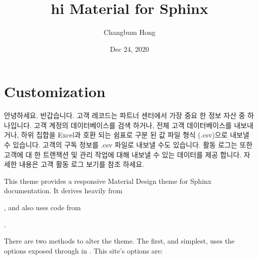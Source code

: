 \documentclass[letterpaper,10pt,english]{sphinxmanual}
\title{hi Material for Sphinx}
\date{Dec 24, 2020}
\author{Changbum Hong}
\begin{document}
\pagestyle{empty}
\sphinxmaketitle
\pagestyle{plain}
\sphinxtableofcontents
\pagestyle{normal}
\label{\detokenize{index::doc}}



\chapter{Customization}
\label{\detokenize{customization:customization}}\label{\detokenize{customization:id1}}\label{\detokenize{customization::doc}}
\noindent{}

안녕하세요. 반갑습니다. 고객 레코드는 파트너 센터에서 가장 중요 한 정보 자산 중 하나입니다. 고객 계정의 데이터베이스를 검색 하거나, 전체 고객 데이터베이스를 내보내거나, 하위 집합을 Excel과 호환 되는 쉼표로 구분 된 값 파일 형식 (.csv)으로 내보낼 수 있습니다. 고객의 구독 정보를 .csv 파일로 내보낼 수도 있습니다.
활동 로그는 또한 고객에 대 한 트랜잭션 및 관리 작업에 대해 내보낼 수 있는 데이터를 제공 합니다. 자세한 내용은 고객 활동 로그 보기를 참조 하세요.

This theme provides a responsive Material Design theme for Sphinx
documentation. It derives heavily from
%
\begin{footnote}[1]\sphinxAtStartFootnote
{}
%
\end{footnote},
and also uses code from
%
\begin{footnote}[2]\sphinxAtStartFootnote
{}
%
\end{footnote}.

There are two methods to alter the theme.  The first, and simplest, uses the
options exposed through  in . This site’s
options are:
\end{document}
